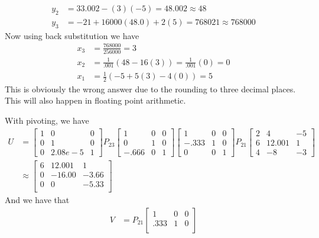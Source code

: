 \documentclass{homework}
\begin{document}
\begin{solution}
\[\begin{aligned}
      y_2 &= 33.002 - (3)(-5) = 48.002 \approx 48 \\
      y_3 &= -21 + 16000(48.0) + 2(5) = 768021 \approx 768000
    \end{aligned}
  \]
  Now using back substitution we have
  \[
    \begin{aligned}
      x_3  &= \frac{768000}{256000} = 3 \\
      x_2 &= \frac{1}{.001}(48 - 16(3)) = \frac{1}{.001}(0) = 0 \\
      x_1 &= \frac{1}{2}(-5 +5(3) - 4(0)) = 5 
    \end{aligned}
  \]
  This is obviously the wrong answer due to the rounding to three decimal places. This will also happen in floating point arithmetic.

  With pivoting, we have 
  \[
    \begin{aligned}
      U &= 
    \begin{bmatrix}
      1 & 0 & 0 \\
      0 & 1 & 0 \\
      0 & 2.08e-5 & 1
    \end{bmatrix}
    P_{23}
    \begin{bmatrix}
      1 & 0 & 0 \\
      0 & 1 & 0 \\
      -.666 & 0 & 1
    \end{bmatrix}
    \begin{bmatrix}
      1 & 0 & 0 \\
      -.333 & 1 & 0 \\
      0 & 0 & 1
    \end{bmatrix}
    P_{21}
   \begin{bmatrix}
     2 & 4 & -5 \\
     6 & 12.001 & 1 \\
     4 & -8 & -3
   \end{bmatrix} \\
   &\approx
   \begin{bmatrix}
     6 & 12.001 & 1 \\
     0 & -16.00 & -3.66 \\
     0 & 0 & -5.33 \\
   \end{bmatrix}
   \end{aligned}
  \]
  And we have that
  \[ 
    \begin{aligned}
      V &= P_{21}
    \begin{bmatrix}
      1 & 0 & 0 \\
      .333 & 1 & 0 \\

\end{bmatrix}
\end{aligned}\]
\end{solution}
\end{document}
